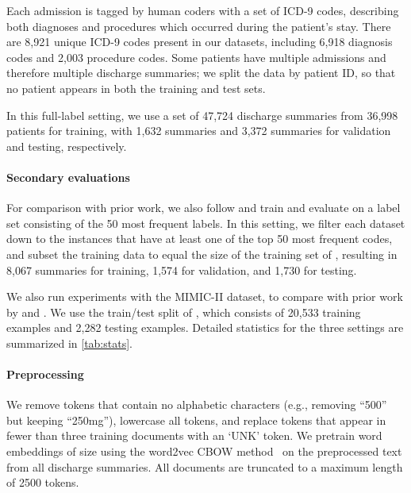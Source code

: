 \documentclass[11pt,a4paper]{article}
\begin{document}
Each admission is tagged by human coders with a set of ICD-9 codes, describing both diagnoses and procedures which occurred during the patient's stay. There are 8,921 unique ICD-9 codes present in our datasets, including 6,918 diagnosis codes and 2,003 procedure codes. Some patients have multiple admissions and therefore multiple discharge summaries; we split the data by patient ID, so that no patient appears in both the training and test sets.

In this full-label setting, we use a set of 47,724 discharge summaries from 36,998 patients for training, with 1,632 summaries and 3,372 summaries for validation and testing, respectively. 

\paragraph{Secondary evaluations}
For comparison with prior work, we also follow  and train and evaluate on a label set consisting of the 50 most frequent labels. In this setting, we filter each dataset down to the instances that have at least one of the top 50 most frequent codes, and subset the training data to equal the size of the training set of , resulting in 8,067 summaries for training, 1,574 for validation, and 1,730 for testing.

We also run experiments with the MIMIC-II dataset, to compare with prior work by  and . We use the train/test split of , which consists of 20,533 training examples and 2,282 testing examples. Detailed  statistics for the three settings are summarized in \autoref{tab:stats}.


\paragraph{Preprocessing}
We remove tokens that contain no alphabetic characters (e.g., removing ``500'' but keeping ``250mg''), lowercase all tokens, and replace tokens that appear in fewer than three training documents with an `UNK' token. We pretrain word embeddings of size  using the word2vec CBOW method~\cite{mikolov2013efficient} on the preprocessed text from all discharge summaries. All documents are truncated to a maximum length of 2500 tokens.
\end{document}
